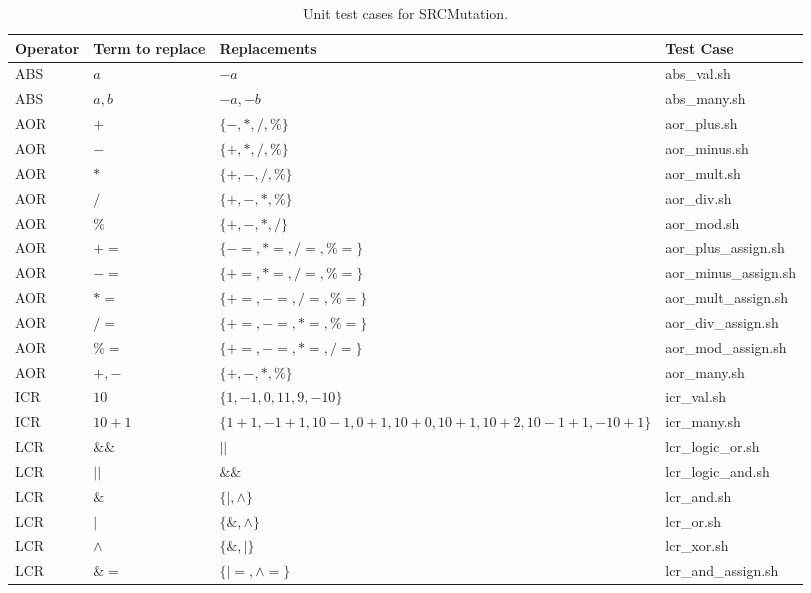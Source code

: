 
\setlength\LTleft{0pt}
\setlength\LTright{0pt}
\scriptsize
\begin{longtable}{|p{1cm}|p{5cm}|p{6cm}|p{2.5cm}|}

\caption{Unit test cases for SRCMutation.}
\label{table:matrix} \\

\hline 
\textbf{Operator}	&	\textbf{Term to replace}	&	\textbf{Replacements}	&	\textbf{Test Case} \\
\hline 
ABS	&	$a$	&	$-a$	&	abs\_val.sh \\
ABS	&	$a,b$	&	$-a,-b$	&	abs\_many.sh \\
AOR	&	$+$	&	$\{-,*,/,\%\}$	&	aor\_plus.sh \\
AOR	&	$-$	&	$\{+,*,/,\%\}$	&	aor\_minus.sh \\
AOR	&	$*$	&	$\{+,-,/,\%\}$	&	aor\_mult.sh \\
AOR	&	$/$	&	$\{+,-,*,\%\}$	&	aor\_div.sh \\
AOR	&	$\%$	&	$\{+,-,*,/\}$	&	aor\_mod.sh \\
AOR	&	$+=$	&	$\{-=,*=,/=,\%=\}$	&	aor\_plus\_assign.sh \\
AOR	&	$-=$	&	$\{+=,*=,/=,\%=\}$	&	aor\_minus\_assign.sh \\
AOR	&	$*=$	&	$\{+=,-=,/=,\%=\}$	&	aor\_mult\_assign.sh \\
AOR	&	$/=$	&	$\{+=,-=,*=,\%=\}$	&	aor\_div\_assign.sh \\
AOR	&	$\%=$	&	$\{+=,-=,*=,/=\}$	&	aor\_mod\_assign.sh \\
AOR	&	$+,-$	&	$\{+,-,*,\%\}$	&	aor\_many.sh \\
ICR	&	$10$	&	$\{1, -1, 0, 11, 9, -10\}$	&	icr\_val.sh \\
ICR	&	$10 + 1$	&	$\{1+1, -1+1, 10-1, 0+1, 10+0, 10+1, 10+2, 10-1+1, -10+1\}$	&	icr\_many.sh \\
LCR	&	$\&\&$	&	$||$	&	lcr\_logic\_or.sh \\
LCR	&	$||$	&	$\&\&$	&	lcr\_logic\_and.sh \\
LCR	&	$\&$	&	$\{|,\land\}$	&	lcr\_and.sh \\
LCR	&	$|$	&	$\{\&,\land\}$	&	lcr\_or.sh \\
LCR	&	$\land$	&	$\{\&,|\}$	&	lcr\_xor.sh \\
LCR	&	$\&=$	&	$\{|=, \land=\}$	&	lcr\_and\_assign.sh \\

\end{longtable}
